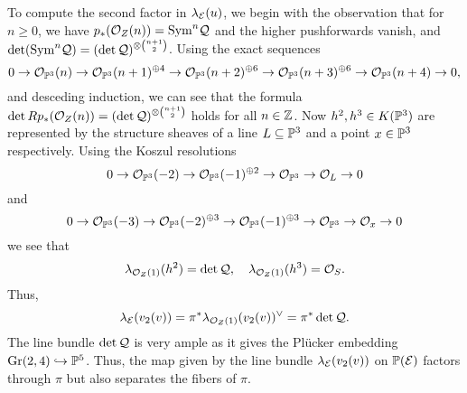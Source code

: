\begin{expl}
To compute the second factor in $\lambda_{\mathcal{E}}(u)$, we begin with the observation that for $n \ge 0$, we have $p_*(\mathcal{O}_Z(n)) = \mathrm{Sym}^n \mathcal{Q}$ and the higher pushforwards vanish, and $\det(\mathrm{Sym}^n \mathcal{Q}) = (\det\mathcal{Q})^{\otimes \binom{n+1}{2}}$. Using the exact sequences
\[ 0 \to \mathcal{O}_{\mathbb{P}^3}(n) \to \mathcal{O}_{\mathbb{P}^3}(n+1)^{\oplus 4} \to \mathcal{O}_{\mathbb{P}^3}(n+2)^{\oplus 6} \to \mathcal{O}_{\mathbb{P}^3}(n+3)^{\oplus 6} \to \mathcal{O}_{\mathbb{P}^3}(n+4) \to 0, \]
and desceding induction, we can see that the formula $\det R p_*(\mathcal{O}_Z(n)) = (\det\mathcal{Q})^{\otimes \binom{n+1}{2}}$ holds for all $n \in \mathbb{Z}$. Now $h^2, h^3 \in K(\mathbb{P}^3)$ are represented by the structure sheaves of a line $L \subseteq \mathbb{P}^3$ and a point $x \in \mathbb{P}^3$ respectively. Using the Koszul resolutions
\[ 0 \to \mathcal{O}_{\mathbb{P}^3}(-2) \to \mathcal{O}_{\mathbb{P}^3}(-1)^{\oplus 2} \to  \mathcal{O}_{\mathbb{P}^3} \to \mathcal{O}_L \to 0 \]
and
\[ 0 \to \mathcal{O}_{\mathbb{P}^3}(-3) \to \mathcal{O}_{\mathbb{P}^3}(-2)^{\oplus 3} \to \mathcal{O}_{\mathbb{P}^3}(-1)^{\oplus 3} \to \mathcal{O}_{\mathbb{P}^3} \to \mathcal{O}_x \to 0 \]
we see that
\[ \lambda_{\mathcal{O}_Z(1)}(h^2) = \det \mathcal{Q}, \quad \lambda_{\mathcal{O}_Z(1)}(h^3) = \mathcal{O}_S. \]
Thus,
\[ \lambda_{\mathcal{E}}(v_2(v)) = \pi^* \lambda_{\mathcal{O}_Z(1)}(v_2(v))^\vee = \pi^* \det \mathcal{Q}. \]
The line bundle $\det \mathcal{Q}$ is very ample as it gives the Pl\"ucker embedding $\mathrm{Gr}(2,4) \hookrightarrow \mathbb{P}^5$. Thus, the map given by the line bundle $\lambda_{\mathcal{E}}(v_2(v))$ on $\mathbb{P}(\mathcal{E})$ factors through $\pi$ but also separates the fibers of $\pi$.
\end{expl}


